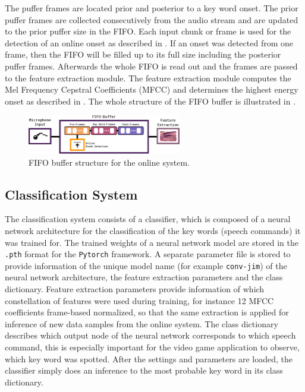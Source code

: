 The puffer frames are located prior and posterior to a key word onset.
The prior puffer frames are collected consecutively from the audio stream and are updated to the prior puffer size in the FIFO. 
Each input chunk or frame is used for the detection of an online onset as described in .
If an onset was detected from one frame, then the FIFO will be filled up to its full size including the posterior puffer frames.
Afterwards the whole FIFO is read out and the frames are passed to the feature extraction module.
The feature extraction module computes the Mel Frequency Cepstral Coefficients (MFCC) and determines the highest energy onset as described in .
The whole structure of the FIFO buffer is illustrated in .
\begin{figure}[!ht]
  \centering
  \includegraphics[width=0.60\textwidth]{./6_game/figs/game_system_fifo}
  \caption{FIFO buffer structure for the online system.}
  \label{fig:game_system_fifo}
\end{figure}
\FloatBarrier
\noindent



\subsection{Classification System}
The classification system consists of a classifier, which is composed of a neural network architecture for the classification of the key words (speech commands) it was trained for.
The trained weights of a neural network model are stored in the \texttt{.pth} format for the \texttt{Pytorch} framework.
A separate parameter file is stored to provide information of the unique model name (for example \texttt{conv-jim}) of the neural network architecture, the feature extraction parameters and the class dictionary.
Feature extraction parameters provide information of which constellation of features were used during training, for instance 12 MFCC coefficients frame-based normalized, so that the same extraction is applied for inference of new data samples from the online system.
The class dictionary describes which output node of the neural network corresponds to which speech command, this is especially important for the video game application to observe, which key word was spotted.
After the settings and parameters are loaded, the classifier simply does an inference to the most probable key word in its class dictionary.

